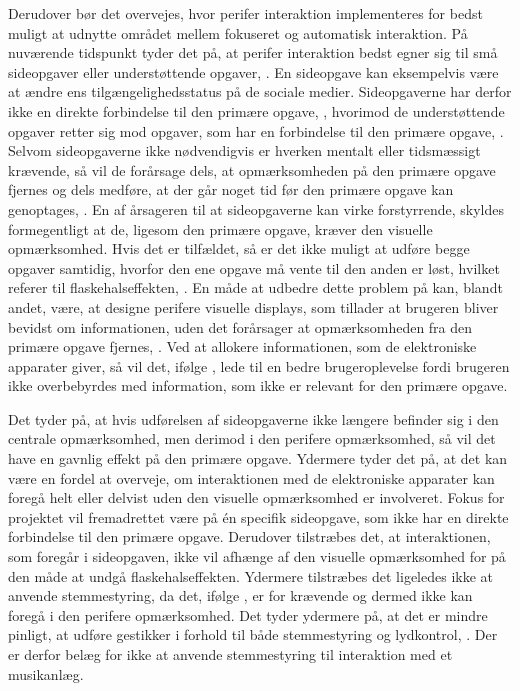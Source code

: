 Derudover bør det overvejes, hvor perifer interaktion implementeres for bedst muligt at udnytte området mellem fokuseret og automatisk interaktion. På nuværende tidspunkt tyder det på, at perifer interaktion bedst egner sig til små sideopgaver eller understøttende opgaver, \parencite[s. 21]{PDF:EvaluatingPI}. En sideopgave kan eksempelvis være at ændre ens tilgængelighedsstatus på de sociale medier. Sideopgaverne har derfor ikke en direkte forbindelse til den primære opgave, \parencite[s. 162]{PDF:ComparingInputModalities}, hvorimod de understøttende opgaver retter sig mod opgaver, som har en forbindelse til den primære opgave, \parencite[s. 21]{PDF:EvaluatingPI}. Selvom sideopgaverne ikke nødvendigvis er hverken mentalt eller tidsmæssigt krævende, så vil de forårsage dels, at opmærksomheden på den primære opgave fjernes og dels medføre, at der går noget tid før den primære opgave kan genoptages, \parencite[s. 162]{PDF:ComparingInputModalities}. En af årsageren til at sideopgaverne kan virke forstyrrende, skyldes formegentligt at de, ligesom den primære opgave, kræver den visuelle opmærksomhed. Hvis det er tilfældet, så er det ikke muligt at udføre begge opgaver samtidig, hvorfor den ene opgave må vente til den anden er løst, hvilket referer til flaskehalseffekten, \parencite[s. 240]{PDF:PICharacteristicsAndConsiderations}. En måde at udbedre dette problem på kan, blandt andet, være, at designe perifere visuelle displays, som tillader at brugeren bliver bevidst om informationen, uden det forårsager at opmærksomheden fra den primære opgave fjernes, \parencite[s. 247]{PDF:AToolkitForManaging}. Ved at allokere informationen, som de elektroniske apparater giver, så vil det, ifølge \textcite[s. 55]{PDF:PITheoriesKap3}, lede til en bedre brugeroplevelse fordi brugeren ikke overbebyrdes med information, som ikke er relevant for den primære opgave. 

Det tyder på, at hvis udførelsen af sideopgaverne ikke længere befinder sig i den centrale opmærksomhed, men derimod i den perifere opmærksomhed, så vil det have en gavnlig effekt på den primære opgave. Ydermere tyder det på, at det kan være en fordel at overveje, om interaktionen med de elektroniske apparater kan foregå helt eller delvist uden den visuelle opmærksomhed er involveret. Fokus for projektet vil fremadrettet være på én specifik sideopgave, som ikke har en direkte forbindelse til den primære opgave. Derudover tilstræbes det, at interaktionen, som foregår i sideopgaven, ikke vil afhænge af den visuelle opmærksomhed for på den måde at undgå flaskehalseffekten. Ydermere tilstræbes det ligeledes ikke at anvende stemmestyring, da det, ifølge \textcite[s. 41]{PDF:PIEmbeddingHCIMicroManageMe}, er for krævende og dermed ikke kan foregå i den perifere opmærksomhed. Det tyder ydermere på, at det er mindre pinligt, at udføre gestikker i forhold til både stemmestyring og lydkontrol, \parencite[s. 4]{PDF:AnExploratoryStudy}. Der er derfor belæg for ikke at anvende stemmestyring til interaktion med et musikanlæg.

